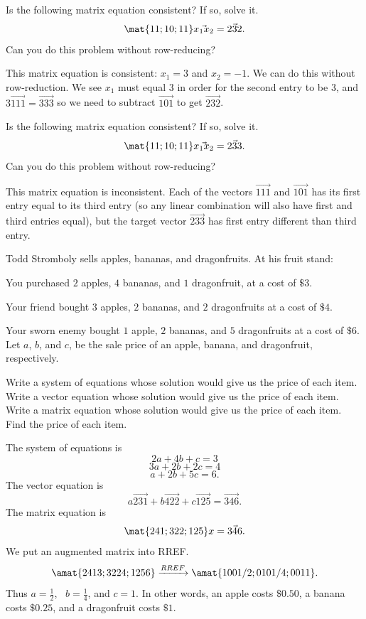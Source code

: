\begin{problems}
\problem %
Is the following matrix equation consistent?  If so, solve it.
\[\mat{1 1; 1 0; 1 1} \vec{x_1 x_2} = \vec{2 3 2}.\]
Can you do this problem without row-reducing?

\begin{solution}
This matrix equation is consistent: $x_1 = 3$ and $x_2 = -1$.  We can do this without row-reduction.  We see $x_1$ must equal $3$ in order for the second entry to be $3$, and $3\vec{1 1 1} = \vec{3 3 3}$ so we need to subtract $\vec{1 0 1}$ to get $\vec{2 3 2}$.
\end{solution}

\problem %
Is the following matrix equation consistent?  If so, solve it.
\[\mat{1 1; 1 0; 1 1} \vec{x_1 x_2} = \vec{2 3 3}.\]
Can you do this problem without row-reducing?

\begin{solution}
 This matrix equation is inconsistent.  Each of the vectors $\vec{1 1 1}$ and $\vec{1 0 1}$ has its first entry equal to its third entry (so any linear combination will also have first and third entries equal), but the target vector $\vec{2 3 3}$ has first entry different than third entry.   
\end{solution}


  
\problem %
Todd Stromboly sells apples, bananas, and dragonfruits.  At his fruit
stand:

You purchased $2$ apples, $4$ bananas, and $1$ dragonfruit, at a cost
of $\$3$.

Your friend bought $3$ apples, $2$ bananas, and $2$ dragonfruits at a
cost of $\$4$.

Your sworn enemy bought $1$ apple, $2$ bananas, and $5$ dragonfruits
at a cost of $\$6$.  \newline Let $a$, $b$, and $c$, be the sale price
of an apple, banana, and dragonfruit, respectively.
\begin{subproblems}
  \subproblem Write a system of equations whose solution would give us
  the price of each item.  %
  \subproblem Write a vector equation whose solution would give us the
  price of each item.
  \subproblem Write a matrix equation whose solution would give us the
  price of each item.  %
  \subproblem Find the price of each item.
\end{subproblems}
\begin{solution}
  \begin{subproblems}
	\subproblem The system of equations is
	\[2a + 4b + c = 3\]
	\[3a + 2b + 2c = 4\]
	\[a + 2b + 5c = 6.\]
    \subproblem The vector equation is
	\[a \vec{2 3 1} + b \vec{4 2 2} + c \vec{1 2 5} = \vec{3 4 6}.\]
	\subproblem The matrix equation is
	\[\mat{2 4 1; 3 2 2; 1 2 5}x = \vec{3 4 6}.\]
	\subproblem We put an augmented matrix into RREF.
	\[\amat{2 4 1 3; 3 2 2 4; 1 2 5 6} \xrightarrow[]{RREF}
      \amat{1 0 0 1/2; 0 1 0 1/4; 0 0 1 1}.\] Thus $a = \frac{1}{2}$,
    \ $b = \frac{1}{4}$, and $c=1$. In other words, an apple costs
    $\$0.50$, a banana costs $\$0.25$, and a dragonfruit costs $\$1$.
	\end{subproblems}	
\end{solution}
	

\end{problems}
